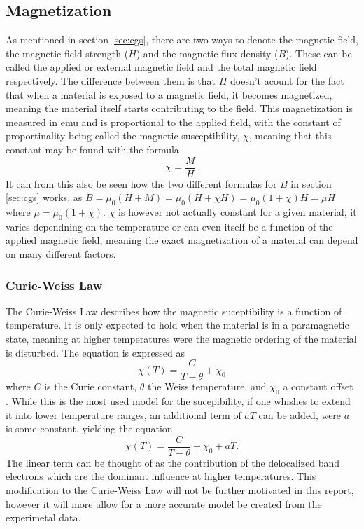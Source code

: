     \subsection{Magnetization}
    As mentioned in section \ref{sec:cgs}, there are two ways to denote the magnetic field, the magnetic field strength ($H$) and the magnetic flux 
    density ($B$). These can be called the applied or external magnetic field and the total magnetic field respectively. The difference between them is 
    that $H$ doesn't acount for the fact that when a material is exposed to a magnetic field, it becomes magnetized, meaning the material itself starts 
    contributing to the field. This magnetization is measured in emu and is proportional to the applied field, with the constant of proportinality being 
    called the magnetic susceptibility, $\chi$, meaning that this constant may be found with the formula \begin{equation}
    \chi = \frac{M}{H}.
\end{equation}\cite{mugiraneza2022tutoria} It can from this also be seen how the two different formulas for $B$ in section \ref{sec:cgs} works, as 
$B=\mu_0(H+M)=\mu_0(H+\chi H)=\mu_0(1+\chi)H=\mu H$ where $\mu=\mu_0(1+\chi)$. $\chi$ is however not actually constant for a given material, 
it varies dependning on the temperature or can even itself be a function of the applied magnetic field, meaning the exact magnetization of a material 
can depend on many different factors.

\subsubsection{Curie-Weiss Law}
The Curie-Weiss Law describes how the magnetic suceptibility is a function of temperature. It is only expected to hold when the material is in a 
paramagnetic state, meaning at higher temperatures were the magnetic ordering of the material is disturbed. The equation is expressed as 
\begin{equation} \chi(T)=\frac{C}{T-\theta} + \chi_0 \end{equation} where $C$ is the Curie constant, $\theta$ the Weiss temperature, and $\chi_0$ a 
constant offset \cite{mugiraneza2022tutoria}. While this is the most used model for the sucepibility, if one whishes to extend it into lower temperature ranges, an additional 
term of $aT$ can be added, were $a$ is some constant, yielding the equation 
\begin{equation} \label{eq:extended-curie-weiss}
    \chi(T)=\frac{C}{T-\theta} + \chi_0 + aT.
\end{equation} The linear term can be thought of as the contribution of the delocalized band electrons which are the dominant influence at higher 
temperatures. This modification to the Curie-Weiss Law will not be further motivated in this report, however it will more allow for a more accurate 
model be created from the experimetal data.


